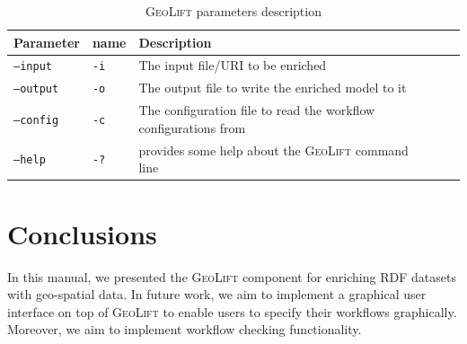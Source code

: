 \documentclass[a4paper,twoside,bibtotoc,abstracton,12pt,BCOR=15mm]{article}
\newcommand{\geolift}{\textsc{GeoLift}\xspace}
\begin{document}
\begin{table}[ht]
\caption{\geolift parameters description} \label{tbl:geoLiftPram}
\begin{tabular}{@{}  l  l p{10.5cm} l p{}@{}}
\toprule
\textbf{Parameter} 	& \textbf{name}	& \textbf{Description}\\
\midrule
\texttt{--input} 	&\texttt{-i}	& The input file/URI to be enriched\\
\texttt{--output} 	&\texttt{-o} 	& The output file to write the enriched model to it\\
\texttt{--config} 	&\texttt{-c} 	& The configuration file to read the workflow configurations from\\
\texttt{--help}		&\texttt{-?} 	& provides some help about the \geolift command line \\
\bottomrule
\end{tabular}
\end{table}



\section{Conclusions}
In this manual, we presented the \geolift component for enriching RDF datasets with geo-spatial data.
In future work, we aim to implement a graphical user interface on top of \geolift to enable users to specify their workflows graphically.
Moreover, we aim to implement workflow checking functionality.



\end{document}
